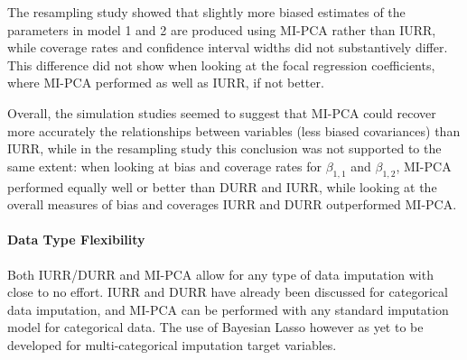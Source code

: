 	The resampling study showed that slightly more biased estimates of the parameters in model 1 and 2 are produced 
	using MI-PCA rather than IURR, while coverage rates and confidence interval widths did not substantively differ.
	This difference did not show when looking at the focal regression coefficients, where MI-PCA performed as well 
	as IURR, if not better.
	
	Overall, the simulation studies seemed to suggest that MI-PCA could recover more accurately the relationships
	between variables (less biased covariances) than IURR, while in the resampling study this conclusion was not
	supported to the same extent: when looking at bias and coverage rates for $\beta_{1,1}$ and $\beta_{1,2}$, MI-PCA 
	performed equally well or better than DURR and IURR, while looking at the overall measures of bias and coverages
	IURR and DURR outperformed MI-PCA.

\paragraph{Data Type Flexibility}
	Both IURR/DURR and MI-PCA allow for any type of data imputation with close to no effort.
	IURR and DURR have already been discussed for categorical data imputation, and MI-PCA can be performed
	with any standard imputation model for categorical data.
	The use of Bayesian Lasso however as yet to be developed for multi-categorical imputation target 
	variables.

